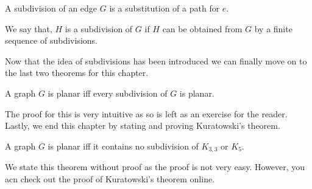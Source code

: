 \begin{defn}
    A subdivision of an edge $G$ is a substitution of a path for $e$.
\end{defn}
\begin{defn}
    We say that, $H$ is a subdivision of $G$ if $H$ can be obtained from $G$ by a finite sequence of subdivisions.
\end{defn}

Now that the idea of subdivisions has been introduced we can finally move on to the last two theorems for this chapter.
\begin{thm}
    A graph $G$ is planar iff every subdivision of $G$ is planar.
\end{thm}
The proof for this is very intuitive as so is left as an exercise for the reader.\\
Lastly, we end this chapter by stating and proving Kuratowski's theorem.\\
\begin{thm}
    A graph $G$ is planar iff it contains no subdivision of $K_{3,3}$ or $K_{5}$.
\end{thm}
We state this theorem without proof as the proof is not very easy. However, you acn check out the proof of Kuratowski's theorem online.